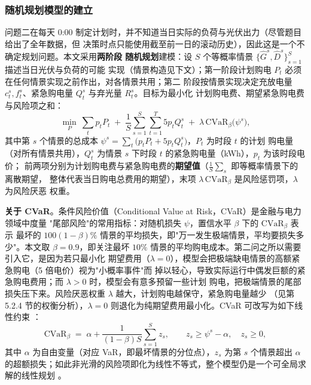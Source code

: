\documentclass[withoutpreface]{cumcmthesis}
\begin{document}
\subsubsection{随机规划模型的建立}
问题二在每天 0:00 制定计划时，并不知道当日实际的负荷与光伏出力（尽管题目给出了全年数据，但
决策时点只能使用截至前一日的滚动历史），因此这是一个不确定规划问题。本文采用\textbf{两阶段
随机规划}建模：设 $S$ 个等概率情景 $\{\hat G^s,\hat D^s\}_{s=1}^S$ 描述当日光伏与负荷的可能
实现（情景构造见下文）；第一阶段计划购电 $P_t$ 必须在任何情景实现之前作出，对各情景共用；第二
阶段按情景实现决定充放电量 $c^s_t,f^s_t$、紧急购电量 $Q^s_t$ 与弃光量 $R^s_t$。目标为最小化
计划购电费、期望紧急购电费与风险项之和：
\begin{equation}
    \min_{P}\ \sum_t p_t P_t \;+\; \frac1S \sum_{s=1}^S\sum_{t=1}^T 5 p_t Q_t^s
        \;+\; \lambda\, \mathrm{CVaR}_\beta\bigl(\psi^s\bigr),
    \label{eq:obj2}
\end{equation}
其中第 $s$ 个情景的总成本 $\psi^s=\sum_t\bigl(p_tP_t + 5p_t Q_t^s\bigr)$，$P_t$ 为时段 $t$ 的计划
购电量（对所有情景共用），$Q_t^s$ 为情景 $s$ 下时段 $t$ 的紧急购电量（kWh），$p_t$ 为该时段电价；
前两项分别为计划购电费与紧急购电费的\textbf{期望值}（$\frac1S\sum_s$ 即等概率情景下的离散期望，
整体代表当日购电总费用的期望），末项 $\lambda\,\mathrm{CVaR}_\beta$ 是风险惩罚项，$\lambda$ 为风险厌恶
权重。

\textbf{关于 CVaR}。条件风险价值（Conditional Value at Risk，CVaR）是金融与电力领域中度量
"尾部风险"的常用指标：对随机损失 $\psi$，置信水平 $\beta$ 下的 $\mathrm{CVaR}_\beta$ 表示
最坏的 $100(1-\beta)\%$ 情景的平均损失，即"万一发生极端情景，平均要损失多少"。本文取
$\beta=0.9$，即关注最坏 $10\%$ 情景的平均购电成本。第二问之所以需要引入它，是因为若只最小化
期望费用（$\lambda=0$），模型会把极端缺电情景的高额紧急购电（5 倍电价）视为"小概率事件"而
掉以轻心，导致实际运行中偶发巨额的紧急购电费用；而 $\lambda>0$ 时，模型会有意多预留一些计划
购电，把极端情景的尾部损失压下来。风险厌恶权重 $\lambda$ 越大，计划购电越保守，紧急购电量越少
（见第 5.2.4 节的权衡分析），$\lambda=0$ 则退化为纯期望费用最小化。CVaR 可改写为如下线性约束
\cite{rp:cvar,cn:cvar}：
\begin{equation}
    \mathrm{CVaR}_\beta \;=\; \alpha + \frac{1}{(1-\beta)S}\sum_{s=1}^S z_s,
    \qquad z_s\ge \psi^s-\alpha,\quad z_s\ge0,
    \label{eq:cvar}
\end{equation}
其中 $\alpha$ 为自由变量（对应 VaR，即最坏情景的分位点），$z_s$ 为第 $s$ 个情景超出 $\alpha$
的超额损失；如此非光滑的风险项即化为线性不等式，整个模型仍是一个可全局求解的线性规划
\cite{cn:stoch}。
\end{document}
